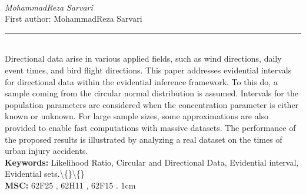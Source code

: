 \documentclass[10pt,twoside]{article}
\begin{document}
\noindent\begin{minipage}[t][\textheight]{\textwidth}
\\[0.35em]
{\itshape MohammadReza Sarvari}\\[0.2em]
{\footnotesize First author: MohammadReza Sarvari}\\[0.45em]
\noindent\rule{\textwidth}{0.3pt}\\[0.4em]
{\footnotesize  Directional data arise in various applied fields, such as wind directions, daily event times, and bird flight directions. This paper addresses evidential intervals for directional data within the evidential inference framework. To this do, a sample coming from the circular normal distribution is assumed. Intervals for the population parameters are considered when the concentration parameter is either known or unknown. For large sample sizes, some approximations are also provided to enable fast computations with massive datasets. The performance of the proposed results is illustrated by analyzing a real dataset on the times of urban injury accidents.}\\[0.4em]
{\footnotesize\bfseries Keywords:} {\footnotesize Likelihood Ratio, Circular and Directional Data, Evidential interval, Evidential sets.\textbackslash\{\}\textbackslash\{\}}\\[0.15em]
{\footnotesize\bfseries MSC:} {\footnotesize 62F25 , 62H11 , 62F15 . 1cm}\\
\vfill
\end{minipage}
\newpage
\end{document}
